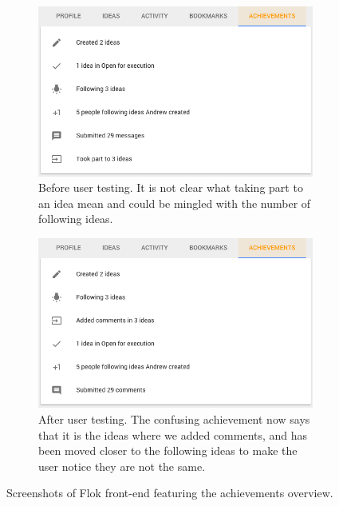 \documentclass[a4paper,12pt,twoside]{article}
\begin{document}
\begin{figure}[!htb]
    \begin{subfigure}[t]{.495\textwidth}
        \includegraphics[width=\textwidth]{images/user_tests/achievements_before.png}
        \caption{Before user testing. It is not clear what taking part to an idea mean and could be mingled with the number of following ideas.}
        \label{fig.tests.achievements.before}
    \end{subfigure}
    \hfill
    \begin{subfigure}[t]{.495\textwidth}
        \includegraphics[width=\textwidth]{images/user_tests/achievements_after.png}
        \caption{After user testing. The confusing achievement now says that it is the ideas where we added comments, and has been moved closer to the following ideas to make the user notice they are not the same.}
        \label{fig.tests.achievements.after}
    \end{subfigure}
    \caption{Screenshots of Flok front-end featuring the achievements overview.}
    \label{fig.tests.achievements}
\end{figure}
\end{document}
